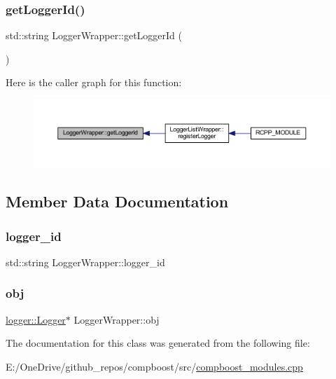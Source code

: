 \subsubsection{\texorpdfstring{get\+Logger\+Id()}{getLoggerId()}}
{\footnotesize\ttfamily std\+::string Logger\+Wrapper\+::get\+Logger\+Id (\begin{DoxyParamCaption}{ }\end{DoxyParamCaption})\hspace{0.3cm}{\ttfamily [inline]}}

Here is the caller graph for this function\+:\nopagebreak
\begin{figure}[H]
\begin{center}
\leavevmode
\includegraphics[width=350pt]{class_logger_wrapper_ad42b6f63cb509a7fa0d7e3aa82a95cb8_icgraph}
\end{center}
\end{figure}


\subsection{Member Data Documentation}
\mbox{\label{class_logger_wrapper_a8fd7e405de19e62a4627999e7b41ab07}} 
\subsubsection{\texorpdfstring{logger\+\_\+id}{logger\_id}}
{\footnotesize\ttfamily std\+::string Logger\+Wrapper\+::logger\+\_\+id\hspace{0.3cm}{\ttfamily [protected]}}

\mbox{\label{class_logger_wrapper_ad6ba450561dc58a6b83fb89c1a7efe97}} 
\subsubsection{\texorpdfstring{obj}{obj}}
{\footnotesize\ttfamily \mbox{\hyperlink{classlogger_1_1_logger}{logger\+::\+Logger}}$\ast$ Logger\+Wrapper\+::obj\hspace{0.3cm}{\ttfamily [protected]}}



The documentation for this class was generated from the following file\+:\begin{DoxyCompactItemize}
\item 
E\+:/\+One\+Drive/github\+\_\+repos/compboost/src/\mbox{\hyperlink{compboost__modules_8cpp}{compboost\+\_\+modules.\+cpp}}\end{DoxyCompactItemize}

